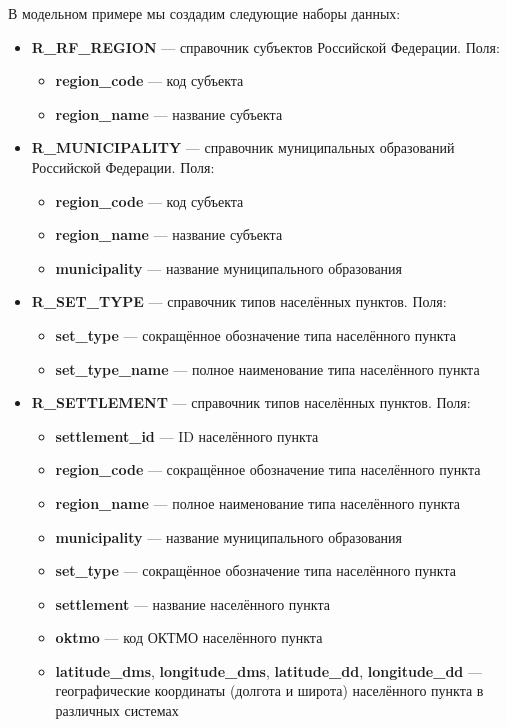 \documentclass[../user-manual.tex]{subfiles}
\begin{document}
	\begin{modelExample}
		В модельном примере мы создадим следующие наборы данных:
		\begin{itemize}
			\item \textbf{R\_RF\_REGION} --- справочник субъектов Российской Федерации. Поля:
				\begin{itemize}
					\item \textbf{region\_code} --- код субъекта
					\item \textbf{region\_name} --- название субъекта
				\end{itemize}
			
			\item \textbf{R\_MUNICIPALITY} --- справочник муниципальных образований Российской Федерации. Поля:
				\begin{itemize}
					\item \textbf{region\_code} --- код субъекта
					\item \textbf{region\_name} --- название субъекта
					\item \textbf{municipality} --- название муниципального образования
				\end{itemize}
						
			\item \textbf{R\_SET\_TYPE} --- справочник типов населённых пунктов. Поля:
				\begin{itemize}
					\item \textbf{set\_type} --- сокращённое обозначение типа населённого пункта
					\item \textbf{set\_type\_name} --- полное наименование типа населённого пункта
				\end{itemize}			
			
			\item \textbf{R\_SETTLEMENT} --- справочник типов населённых пунктов. Поля:
				\begin{itemize}
					\item \textbf{settlement\_id} --- ID населённого пункта
					\item \textbf{region\_code} --- сокращённое обозначение типа населённого пункта
					\item \textbf{region\_name} --- полное наименование типа населённого пункта
					\item \textbf{municipality} --- название муниципального образования
					\item \textbf{set\_type} --- сокращённое обозначение типа населённого пункта
					\item \textbf{settlement} --- название населённого пункта
					\item \textbf{oktmo} --- код ОКТМО населённого пункта
					\item \textbf{latitude\_dms}, \textbf{longitude\_dms}, \textbf{latitude\_dd}, \textbf{longitude\_dd} --- географические координаты (долгота и широта) населённого пункта в различных системах
				\end{itemize}
			

\end{itemize}
\end{modelExample}
\end{document}

